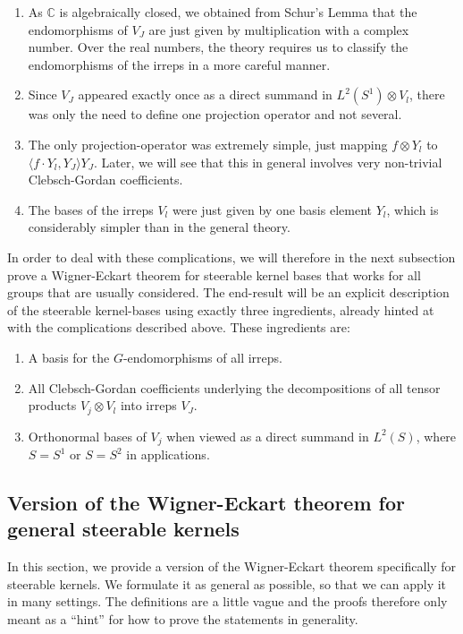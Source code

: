 \documentclass[12pt, a4paper]{article}
\theoremstyle{plain}
\theoremstyle{definition}
\theoremstyle{remark}
\newcommand{\C}{\mathds{C}}
\begin{document}
\begin{enumerate}
\item As $\C$ is algebraically closed, we obtained from Schur's Lemma that the endomorphisms of $V_J$ are just given by multiplication with a complex number. Over the real numbers, the theory requires us to classify the endomorphisms of the irreps in a more careful manner.
\item Since $V_J$ appeared exactly once as a direct summand in $L^2\left(S^1\right) \otimes V_l$, there was only the need to define one projection operator and not several.
\item The only projection-operator was extremely simple, just mapping $f \otimes Y_l$ to $\langle f \cdot Y_l, Y_{J} \rangle Y_{J}$. Later, we will see that this in general involves very non-trivial Clebsch-Gordan coefficients.
\item The bases of the irreps $V_l$ were just given by one basis element $Y_l$, which is considerably simpler than in the general theory.
\end{enumerate}

In order to deal with these complications, we will therefore in the next subsection prove a Wigner-Eckart theorem for steerable kernel bases that works for all groups that are usually considered. The end-result will be an explicit description of the steerable kernel-bases using exactly three ingredients, already hinted at with the complications described above. These ingredients are:
\begin{enumerate}
\item A basis for the $G$-endomorphisms of all irreps.
\item All Clebsch-Gordan coefficients underlying the decompositions of all tensor products $V_j \otimes V_l$ into irreps $V_J$.
\item Orthonormal bases of $V_j$ when viewed as a direct summand in $L^2(S)$, where $S = S^1$ or $S = S^2$ in applications.
\end{enumerate}

\subsection{Version of the Wigner-Eckart theorem for general steerable kernels}\label{general_wigner_eckart}

In this section, we provide a version of the Wigner-Eckart theorem specifically for steerable kernels. We formulate it as general as possible, so that we can apply it in many settings. The definitions are a little vague and the proofs therefore only meant as a ``hint'' for how to prove the statements in generality. 
\end{document}
